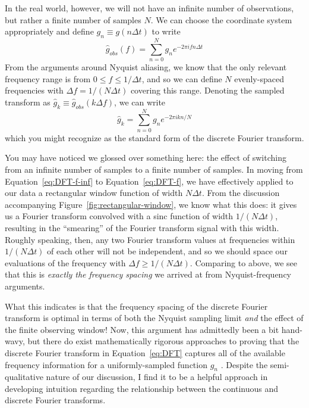 \documentclass[preprint]{aastex}
\newcommand{\fig}[1]{Figure~\ref{fig:#1}}
\newcommand{\Eq}[1]{Equation~\ref{eq:#1}}
\newcommand{\eq}[1]{\Eq{#1}}
\newcommand{\eqlabel}[1]{\label{eq:#1}}
\begin{document}
In the real world, however, we will not have an infinite number of observations,
but rather a finite number of samples $N$.
We can choose the coordinate system appropriately and define
$g_n \equiv g(n\Delta t)$ to write
\begin{equation}
  \hat{g}_{obs}(f) = \sum_{n=0}^N g_n e^{-2\pi i f n \Delta t}
  \eqlabel{DFT-f}
\end{equation}
From the arguments around Nyquist aliasing, we know that the only relevant
frequency range is from $0 \le f \le 1/\Delta t$, and so we can define $N$
evenly-spaced frequencies with $\Delta f = 1 / (N\Delta t)$ covering this range.
Denoting the sampled transform as
$\hat{g}_k \equiv \hat{g}_{obs}(k\Delta f)$, we can write
\begin{equation}
  \hat{g}_k = \sum_{n=0}^N g_n e^{-2\pi i k n / N}
  \eqlabel{DFT}
\end{equation}
which you might recognize as the standard form of the discrete Fourier
transform.

You may have noticed we glossed over something here: the effect of switching
from an infinite number of samples to a finite number of samples.
In moving from \eq{DFT-f-inf} to \eq{DFT-f}, we have effectively applied
to our data a rectangular window function of width $N\Delta t$.
From the discussion accompanying \fig{rectangular-window}, we know what this
does: it gives us a Fourier transform convolved with a sinc function of width
$1 / (N\Delta t)$, resulting in the ``smearing'' of the Fourier transform signal
with this width.
Roughly speaking, then, any two Fourier transform values at frequencies within
$1/(N\Delta t)$ of each other will not be independent, and so we should space
our evaluations of the frequency with $\Delta f \ge 1/(N\Delta t)$.
Comparing to above, we see that this is {\it exactly the frequency spacing}
we arrived at from Nyquist-frequency arguments.

What this indicates is that the frequency spacing of the discrete Fourier
transform is optimal in terms of both the Nyquist sampling limit
{\it and} the effect of the finite observing window!
Now, this argument has admittedly been a bit hand-wavy, but there do exist
mathematically rigorous approaches to proving that the discrete Fourier
transform in \eq{DFT} captures all of the available frequency information
for a uniformly-sampled function $g_n$
\citep[see, e.g.][]{FoundationsOfSignalProcessing}.
Despite the semi-qualitative nature of our discussion,
I find it to be a helpful approach
in developing intuition regarding the relationship between the
continuous and discrete Fourier transforms.
\end{document}

